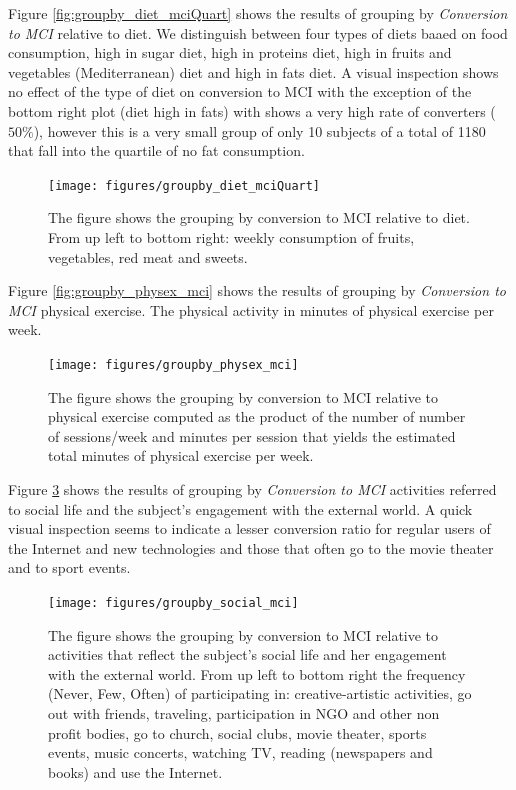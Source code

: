 \documentclass[11pt]{article}
\theoremstyle{definition}
\theoremstyle{remark}
\begin{document}
Figure \ref{fig:groupby_diet_mciQuart} shows the results of grouping by \emph{Conversion to MCI} relative to diet. We distinguish between four types of diets baaed on food consumption, high in sugar diet, high in proteins diet, high in fruits and vegetables (Mediterranean) diet and high in fats diet. A visual inspection shows no effect of the type of diet on conversion to MCI with the exception of the bottom right plot (diet high in fats) with shows a very high rate of converters ($50\%$), however this is a very small group of only 10 subjects of a total of 1180 that fall into the quartile of no fat consumption. 
\begin{figure}[H]
        \centering
        \texttt{[image: figures/groupby\_diet\_mciQuart]}
        \caption{The figure shows the grouping by conversion to MCI relative to diet. From up left to bottom right: weekly consumption of fruits, vegetables, red meat and sweets.} 
        \label{fig:groupby_sleep_mci}
\end{figure}

Figure \ref{fig:groupby_physex_mci} shows the results of grouping by \emph{Conversion to MCI} physical exercise. The physical activity in minutes of physical exercise per week. %

\begin{figure}[H]
        \centering
        \texttt{[image: figures/groupby\_physex\_mci]}
        \caption{The figure shows the grouping by conversion to MCI relative to physical exercise computed as the product of the number of number of sessions/week and minutes per session that yields the estimated total minutes of physical exercise per week.} 
        \label{fig:groupby_sleep_mci}
\end{figure}

Figure \ref{fig:groupby_social_mci} shows the results of grouping by \emph{Conversion to MCI} activities referred to social life and the subject's engagement with the external world. A quick visual inspection seems to indicate a lesser conversion ratio for regular users of the Internet and new technologies and those that often go to the movie theater and to sport events.

\begin{figure}[H]
        \centering
        \texttt{[image: figures/groupby\_social\_mci]}
        \caption{The figure shows the grouping by conversion to MCI relative to activities that reflect the subject's social life and her  engagement with the external world. From up left to bottom right the frequency (Never, Few, Often) of participating in: creative-artistic activities, go out with friends, traveling, participation in NGO and other non profit bodies, go to church,  
        social clubs, movie theater, sports events, music concerts, watching TV, reading (newspapers and books) and use the Internet.}
        \label{fig:groupby_social_mci}
\end{figure}
\end{document}
